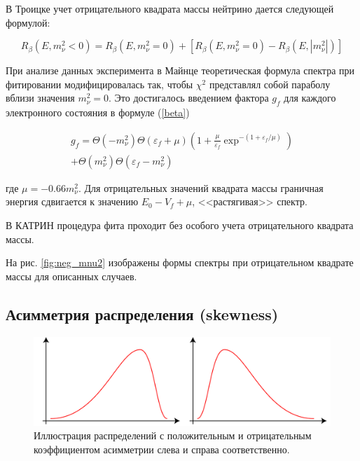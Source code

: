 \documentclass[a4paper,14pt]{extarticle}
\begin{document}
    В Троицке учет отрицательного квадрата массы нейтрино дается следующей формулой:
    
    \begin{equation}
      R_\beta(E, m^2_\nu<0) = R_\beta(E, m^2_\nu=0) + [R_\beta(E, m^2_\nu=0) - R_\beta(E, |m^2_\nu|)]
    \end{equation}
    
    При анализе данных эксперимента в Майнце\cite{kraus} теоретическая формула спектра при фитировании
    модифицировалась так, чтобы $\chi^2$ представлял собой параболу вблизи значения $m_\nu^2 = 0$.
    Это достигалось введением фактора $g_f$ для каждого электронного состояния в формуле (\ref{beta})
    
    \begin{equation}
    \begin{split}
      g_f = \Theta(-m_\nu^2)\Theta(\varepsilon_f+\mu)(1+\frac{\mu}{\varepsilon_f}\exp^{-(1+\varepsilon_f/\mu)}) \\
      +\Theta(m_\nu^2)\Theta(\varepsilon_f-m_\nu^2)
    \end{split}
    \end{equation}
    
    \noindent где $\mu = -0.66 m^2_\nu$. Для отрицательных значений квадрата массы граничная
    энергия сдвигается к значению $E_0-V_f+\mu$, <<растягивая>> спектр.
    
    В КАТРИН процедура фита проходит без особого учета отрицательного квадрата массы.
    
    На рис. \ref{fig:neg_mnu2} изображены формы спектры при отрицательном квадрате массы
    для описанных случаев.
    
    \subsection{Асимметрия распределения (skewness)}
    \begin{figure}[h]
      \center
        \includegraphics[width=1\textwidth]{skewness}
        \captionsetup{width=0.8\textwidth}
        \caption{Иллюстрация распределений с положительным и отрицательным коэффициентом асимметрии
        слева и справа соответственно.}
        \label{fig:skewness}
    \end{figure}
    
\end{document}
